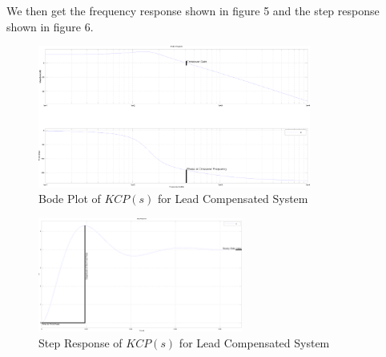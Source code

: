 \documentclass[12pt]{article}
\begin{document}
We then get the frequency response shown in figure 5 and the step response shown in figure 6.

\begin{figure}[ht]
\centering
\includegraphics[width=0.8\textwidth]{lab5-lead-bode.png}
\caption{Bode Plot of $KCP(s)$ for Lead Compensated System}
\end{figure}

\begin{figure}[ht]
\centering
\includegraphics[width=0.6\textwidth]{lab5-lead-step.png}
\caption{Step Response of $KCP(s)$ for Lead Compensated System}
\end{figure}
\end{document}
